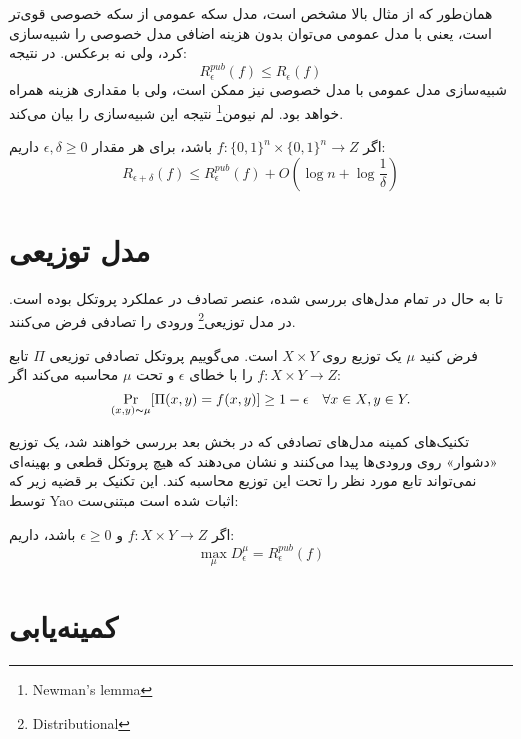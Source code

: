 همان‌طور که از مثال بالا مشخص است، مدل سکه عمومی از سکه خصوصی قوی‌تر است، یعنی با مدل عمومی می‌توان بدون هزینه اضافی مدل خصوصی را شبیه‌سازی کرد، ولی نه برعکس. در نتیجه:
\[R_\epsilon^{pub} (f) \leq R_\epsilon (f)\] 
شبیه‌سازی مدل عمومی با مدل خصوصی نیز ممکن است، ولی با مقداری هزینه همراه خواهد بود. لم نیومن\footnote{Newman's lemma} نتیجه این شبیه‌سازی را بیان می‌کند.
\begin{theorem}
اگر $f : \{0,1\}^n \times \{0,1\}^n \rightarrow Z$ باشد، برای هر مقدار $\epsilon,  \delta \geq 0$ داریم:
\begin{equation}
‌R_{\epsilon+\delta}(f) \leq R_\epsilon^{pub} (f) + O(\log n + \log \frac{1}{\delta}
)
\end{equation}
\end{theorem}
\section{مدل توزیعی}\label{dist_rand}
تا به حال در تمام مدل‌های بررسی شده، عنصر تصادف در عملکرد پروتکل بوده است. در مدل توزیعی\footnote{Distributional} ورودی را تصادفی فرض می‌کنند. 
\begin{definition}
فرض کنید $\mu$ یک توزیع روی $X \times Y$ است. 
می‌گوییم پروتکل تصادفی توزیعی $\Pi$ تابع $f : X \times Y \rightarrow Z$ را با خطای $\epsilon$ و تحت $\mu$ محاسبه می‌کند اگر:
\begin{equation}
\Pr_{(x, y) \thicksim \mu} [\Pi(x, y) = f(x,y)] \geq 1 - \epsilon \quad \forall x \in X, y \in Y.
\end{equation}
\end{definition}

تکنیک‌های کمینه مدل‌های تصادفی که در بخش بعد بررسی خواهند شد، یک توزیع «دشوار» روی ورودی‌ها پیدا می‌کنند و نشان می‌دهند که هیچ پروتکل قطعی‌ و بهینه‌ای نمی‌تواند تابع مورد نظر را تحت این توزیع محاسبه کند. این تکنیک بر قضیه زیر که توسط Yao اثبات شده است مبتنی‌ست:
\begin{theorem}
اگر $f : X \times Y \rightarrow Z$ و $\epsilon \geq 0$ باشد، داریم:
\begin{equation}
\max_\mu D^\mu_{\epsilon} = R_\epsilon^{pub}(f)
\end{equation}
\end{theorem}
\section{کمینه‌یابی}
